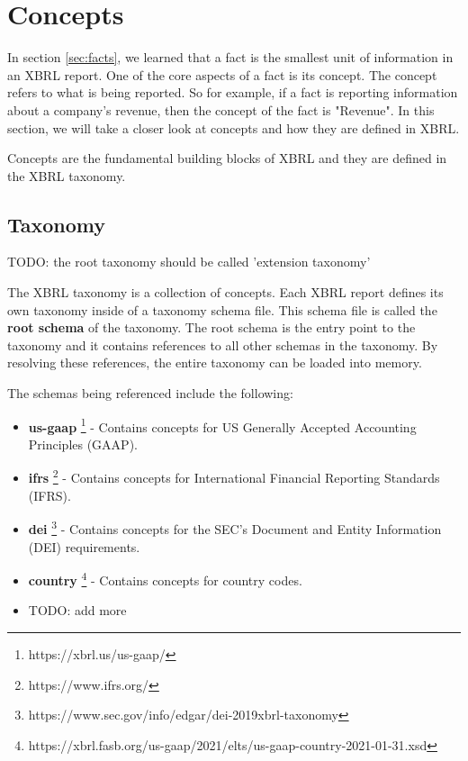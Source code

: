 \section{Concepts}

In section \ref{sec:facts}, we learned that a fact is the smallest unit of information in an XBRL report. 
One of the core aspects of a fact is its concept. 
The concept refers to what is being reported. 
So for example, if a fact is reporting information about a company's revenue, then the concept of the fact is "Revenue".
In this section, we will take a closer look at concepts and how they are defined in XBRL.

Concepts are the fundamental building blocks of XBRL and they are defined in the XBRL taxonomy. 

\subsection{Taxonomy}

TODO: the root taxonomy should be called 'extension taxonomy'

The XBRL taxonomy is a collection of concepts. 
Each XBRL report defines its own taxonomy inside of a taxonomy schema file.
This schema file is called the \textbf{root schema} of the taxonomy.
The root schema is the entry point to the taxonomy and it contains references to all other schemas in the taxonomy.
By resolving these references, the entire taxonomy can be loaded into memory.

The schemas being referenced include the following:

\begin{itemize}
    \item \textbf{us-gaap} \footnote[0]{https://xbrl.us/us-gaap/} - Contains concepts for US Generally Accepted Accounting Principles (GAAP).
    \item \textbf{ifrs} \footnote[1]{https://www.ifrs.org/} - Contains concepts for International Financial Reporting Standards (IFRS).
    \item \textbf{dei} \footnote[2]{https://www.sec.gov/info/edgar/dei-2019xbrl-taxonomy} - Contains concepts for the SEC's Document and Entity Information (DEI) requirements.
    \item \textbf{country} \footnote[3]{https://xbrl.fasb.org/us-gaap/2021/elts/us-gaap-country-2021-01-31.xsd} - Contains concepts for country codes.
    \item TODO: add more
\end{itemize}